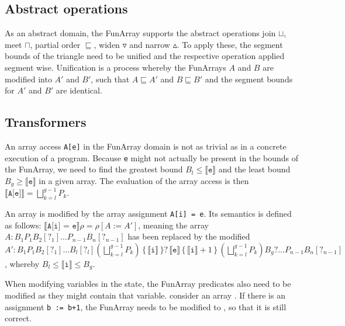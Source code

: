 \subsection{Abstract operations}

As an abstract domain, the FunArray supports the abstract operations join $\sqcup$, meet $\sqcap$, partial order $\sqsubseteq$, widen $\triangledown$ and narrow $\vartriangle$. To apply these, the segment bounds of the triangle need to be unified and the respective operation applied segment wise. Unification is a process whereby the FunArrays $A$ and $B$ are modified into $A'$ and $B'$, such that $A\sqsubseteq A'$ and $B\sqsubseteq B'$ and the segment bounds for $A'$ and $B'$ are identical.


\subsection{Transformers}

An array access \texttt{A[e]} in the FunArray domain is not as trivial as in a concrete execution of a program. Because \texttt{e} might not actually be present in the bounds of the FunArray, we need to find the greatest bound $B_l\leq \llbracket \texttt{e}\rrbracket$ and the least bound $B_g\geq \llbracket \texttt{e}\rrbracket$ in a given array. The evaluation of the array access is then $\llbracket\texttt{A[e]}\rrbracket=\bigsqcup^{g-1}_{k=l}P_k$.

An array is modified by the array assignment \texttt{A[i] = e}. Its semantics is defined as follows: $\llbracket\texttt{A[i] = e}\rrbracket\rho=\rho[A:=A']$, meaning the array $A: B_1P_1B_2[?_1]\ldots P_{n-1}\allowbreak{}B_n[?_{n-1}]$ has been replaced by the modified $A': B_1P_1B_2[?_1]\ldots\allowbreak B_l[?_l] (\bigsqcup^{g-1}_{k=l}P_k)\allowbreak\, \{\,\llbracket\texttt{i}\rrbracket\,\}?\, \llbracket\texttt{e}\rrbracket \allowbreak\,\{\,\llbracket\texttt{i}\rrbracket+1\,\}\, \allowbreak(\bigsqcup^{g-1}_{k=l}P_k) B_g?\ldots \allowbreak P_{n-1}B_n[?_{n-1}]$, whereby $B_l\leq\llbracket\texttt{i}\rrbracket\leq B_g$.

When modifying variables in the state, the FunArray predicates also need to be modified as they might contain that variable. consider an array . If there is an assignment \texttt{b := b+1}, the FunArray needs to be modified to , so that it is still correct. 















